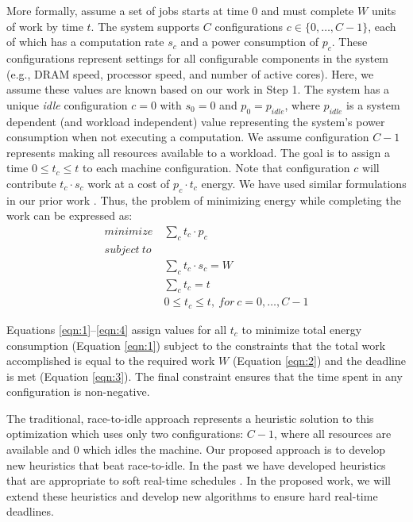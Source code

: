More formally, assume a set of jobs starts at time $0$ and must
complete $W$ units of work by time $t$. The system supports $C$
configurations $c \in \{0,\dots,C-1\}$, each of which has a
computation rate $s_c$ and a power consumption of $p_c$. These
configurations represent settings for all configurable components in
the system (e.g., DRAM speed, processor speed, and number of active
cores).  Here, we assume these values are known based on our work in
Step 1. The system has a unique \emph{idle} configuration $c = 0$ with
$s_0 = 0$ and $p_0 = p_{idle}$, where $p_{idle}$ is a system dependent
(and workload independent) value representing the system's power
consumption when not executing a computation. We assume configuration
$C-1$ represents making all resources available to a workload.  The
goal is to assign a time $0 \le t_c \le t$ to each machine
configuration.  Note that configuration $c$ will contribute $t_c \cdot
s_c$ work at a cost of $p_c \cdot t_c$ energy.  We have used similar
formulations in our prior work \cite{LEO,POET,kim-cpsna}. Thus, the
problem of minimizing energy while completing the work can be
expressed as:
\begin{align*}
minimize~& \sum_c t_c \cdot p_c \tag{1} \label{eqn:1}\\
subject~to~\\
& \sum_c t_c \cdot s_c = W \tag{2} \label{eqn:2}\\
& \sum_c t_c = t \tag{3} \label{eqn:3}\\
& 0 \le t_c \le t,~for~c = 0,\dots,C-1 \tag{4} \label{eqn:4}
\end{align*}

Equations \ref{eqn:1}--\ref{eqn:4} assign values for all $t_c$ to
minimize total energy consumption (Equation \ref{eqn:1}) subject to the
constraints that the total work accomplished is equal to the required
work $W$ (Equation \ref{eqn:2}) and the deadline is met (Equation
\ref{eqn:3}). The final constraint ensures that the time spent in any
configuration is non-negative.

The traditional, race-to-idle approach represents a heuristic solution
to this optimization which uses only two configurations: $C-1$, where
all resources are available and $0$ which idles the machine.  Our
proposed approach is to develop new heuristics that beat race-to-idle.
In the past we have developed heuristics that are appropriate to soft
real-time schedules \cite{POET,EMSOFT}.  In the proposed work, we will
extend these heuristics and develop new algorithms to ensure hard
real-time deadlines.  

